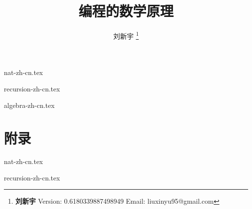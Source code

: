 \documentclass[UTF8, a4paper,twoside]{book} %
\begin{document}


\title{{\bf \Huge 编程的数学原理}
  \centering
            }

\author{刘新宇
  \thanks{{\bfseries 刘新宇} \newline
    Version: 0.6180339887498949 \newline
    Email: liuxinyu95@gmail.com \newline
    }}

\maketitle


\tableofcontents
\newpage

{nat-zh-cn.tex}

{recursion-zh-cn.tex}

{algebra-zh-cn.tex}

\part{附录}
\appendix
\noappendicestocpagenum
\addappheadtotoc

{nat-zh-cn.tex}

{recursion-zh-cn.tex}

%

\printindex
\end{document}
